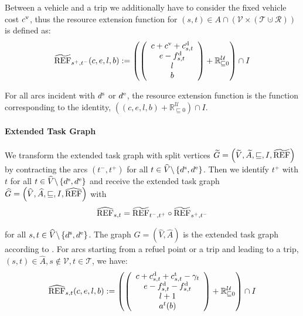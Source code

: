 Between a vehicle and a trip we additionally have to consider the fixed vehicle cost $c^{\operatorname{v}}$, thus the resource extension function for ${(s,t)\in A\cap\left(\mathcal{V}\times\left(\mathcal{T}\cupdot\mathcal{R}\right)\right)}$ is defined as:
\begin{align*}
	\widetilde{\operatorname{REF}}_{s^+,t^-}(c,e,l,b) := \left(\left(
	\begin{array}{c}
		c + c^{\operatorname{v}} + c^{\operatorname{d}}_{s,t} \\ e-f^{\operatorname{d}}_{s,t} \\ l \\ b
	\end{array}
	\right) + \mathbb{R}^{\mathcal{U}}_{\sqsubseteq 0}\right) \cap I
\end{align*}

For all arcs incident with $d^{\operatorname{s}}$ or $d^{\operatorname{e}}$, the resource extension function is the function corresponding to the identity, \ie ${\left((c,e,l,b)+\mathbb{R}^{\mathcal{U}}_{\sqsubseteq 0}\right)\cap I}$.

\paragraph{Extended Task Graph} \parfill

We transform the extended task graph with split vertices ${\widetilde{G}=\left(\widetilde{V},\widetilde{A},\sqsubseteq,I,\widetilde{\operatorname{REF}}\right)}$ by contracting the arcs $\left(t^-,t^+\right)$ for all $t\in\widehat{V}\backslash\left\{d^{\operatorname{s}},d^{\operatorname{e}}\right\}$. Then we identify $t^+$ with $t$ for all $t\in\widehat{V}\backslash\left\{d^{\operatorname{s}},d^{\operatorname{e}}\right\}$ and receive the extended task graph ${\widehat{G}=\left(\widehat{V},\widehat{A},\sqsubseteq,I,\widehat{\operatorname{REF}}\right)}$ with
\begin{align*}
	\widehat{\operatorname{REF}}_{s,t} = \widetilde{\operatorname{REF}}_{t^-,t^+}\circ\widetilde{\operatorname{REF}}_{s^+,t^-}
\end{align*}

for all $s,t\in\widehat{V}\backslash\left\{d^{\operatorname{s}},d^{\operatorname{e}}\right\}$. The graph ${\widehat{G}=\left(\widehat{V},\widehat{A}\right)}$ is the extended task graph according to . For arcs starting from a refuel point or a trip and leading to a trip, \ie ${(s,t)\in\widehat{A},s\notin\mathcal{V},t\in\mathcal{T}}$, we have:
\begin{align*}
	\widehat{\operatorname{REF}}_{s,t}(c,e,l,b) := \left(\left(
	\begin{array}{c}
		c + c^{\operatorname{d}}_{s,t} + c^{\operatorname{t}}_{s,t} - \gamma_t \\ e - f^{\operatorname{d}}_{s,t} - f^{\operatorname{d}}_{s,t} \\ l + 1 \\ a^t(b)
	\end{array}
	\right) + \mathbb{R}^{\mathcal{U}}_{\sqsubseteq 0}\right) \cap I
\end{align*}

